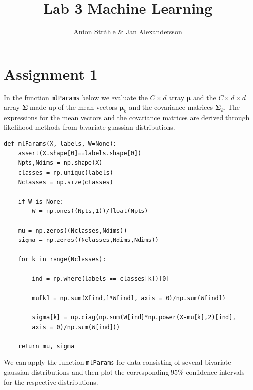 \documentclass{article}
\begin{document}
\title{Lab 3 Machine Learning}
\author{Anton Stråhle \& Jan Alexandersson}
\maketitle

\section*{Assignment 1}

In the function \texttt{mlParams} below we evaluate the $C \times d$ array $\boldsymbol\mu$ and the $C \times d \times d$ array $\boldsymbol\Sigma$ made up of the mean vectors $\boldsymbol\mu_k$ and the covariance matrices $\boldsymbol\Sigma_k$. The expressions for the mean vectors and the covariance matrices are derived through likelihood methods from bivariate guassian distributions.

\begin{lstlisting}
def mlParams(X, labels, W=None):
    assert(X.shape[0]==labels.shape[0])
    Npts,Ndims = np.shape(X)
    classes = np.unique(labels)
    Nclasses = np.size(classes)

    if W is None:
        W = np.ones((Npts,1))/float(Npts)

    mu = np.zeros((Nclasses,Ndims))
    sigma = np.zeros((Nclasses,Ndims,Ndims))
    
    for k in range(Nclasses):
        
        ind = np.where(labels == classes[k])[0]
        
        mu[k] = np.sum(X[ind,]*W[ind], axis = 0)/np.sum(W[ind])
        
        sigma[k] = np.diag(np.sum(W[ind]*np.power(X-mu[k],2)[ind],
        axis = 0)/np.sum(W[ind]))   
                          
    return mu, sigma
\end{lstlisting}

We can apply the function \texttt{mlParams} for data consisting of several bivariate gaussian distributions and then plot the corresponding $95\%$ confidence intervals for the respective distributions.
\end{document}
